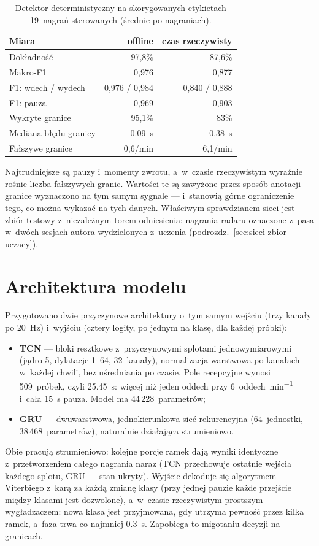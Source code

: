 \documentclass[12pt,a4paper,oneside]{report}
\begin{document}
\begin{table}[H]
\centering
\caption{Detektor deterministyczny na skorygowanych etykietach 19~nagrań
sterowanych (średnie po nagraniach).}
\label{tab:fazy-baseline}
\begin{tabular}{@{}lrr@{}}
\toprule
Miara & offline & czas rzeczywisty \\
\midrule
Dokładność & 97,8\% & 87,6\% \\
Makro-F1 & 0,976 & 0,877 \\
F1: wdech / wydech & 0,976 / 0,984 & 0,840 / 0,888 \\
F1: pauza & 0,969 & 0,903 \\
Wykryte granice & 95,1\% & 83\% \\
Mediana błędu granicy & \SI{0.09}{s} & \SI{0.38}{s} \\
Fałszywe granice & 0,6/min & 6,1/min \\
\bottomrule
\end{tabular}
\end{table}

Najtrudniejsze są pauzy i~momenty zwrotu, a~w~czasie rzeczywistym wyraźnie
rośnie liczba fałszywych granic. Wartości te są zawyżone przez sposób
anotacji --- granice wyznaczono na tym samym sygnale --- i~stanowią górne
ograniczenie tego, co można wykazać na tych danych. Właściwym sprawdzianem
sieci jest zbiór testowy z~niezależnym torem odniesienia: nagrania radaru oznaczone
z~pasa w~dwóch sesjach autora wydzielonych z~uczenia (podrozdz.~\ref{sec:sieci-zbior-uczacy}).

\section{Architektura modelu}
\label{sec:sieci-architektura}

Przygotowano dwie przyczynowe architektury o~tym samym wejściu (trzy kanały
po \SI{20}{Hz}) i~wyjściu (cztery logity, po jednym na klasę, dla każdej próbki):
\begin{itemize}
  \item \textbf{TCN} --- bloki resztkowe z~przyczynowymi splotami
  jednowymiarowymi (jądro 5, dylatacje 1--64, 32~kanały), normalizacja
  warstwowa po kanałach w~każdej chwili, bez uśredniania po czasie. Pole
  recepcyjne wynosi 509~próbek, czyli \SI{25.45}{s}: więcej niż jeden oddech
  przy \SI{6}{oddech\per\minute} i~cała \SI{15}{s} pauza. Model ma
  44\,228~parametrów;
  \item \textbf{GRU} --- dwuwarstwowa, jednokierunkowa sieć rekurencyjna
  (64~jednostki, 38\,468~parametrów), naturalnie działająca strumieniowo.
\end{itemize}
Obie pracują strumieniowo: kolejne porcje ramek dają wyniki identyczne
z~przetworzeniem całego nagrania naraz (TCN przechowuje ostatnie wejścia
każdego splotu, GRU --- stan ukryty). Wyjście dekoduje się algorytmem
Viterbiego z~karą za każdą zmianę klasy (przy jednej pauzie każde przejście między
klasami jest dozwolone), a~w~czasie rzeczywistym prostszym wygładzaczem: nowa klasa
jest przyjmowana, gdy utrzyma pewność przez kilka ramek, a~faza trwa co najmniej
\SI{0.3}{s}. Zapobiega to migotaniu decyzji na granicach.
\end{document}
